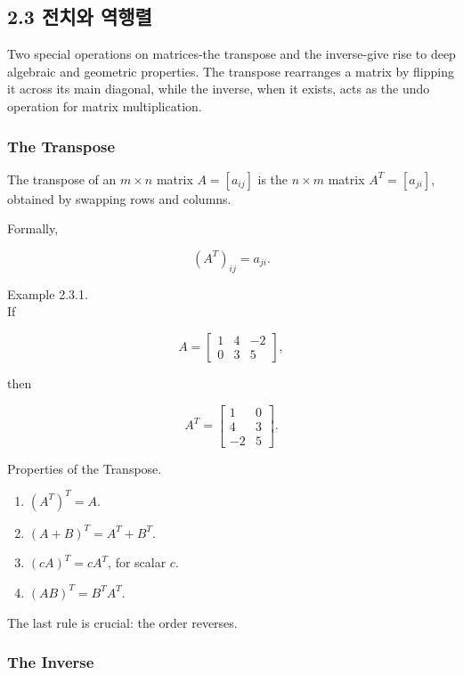 \documentclass[
  12pt,
  a4paper,
]{article}
\begin{document}
\subsection{2.3 전치와 역행렬}\label{23-transpose-and-inverse}

Two special operations on matrices-the transpose and the inverse-give
rise to deep algebraic and geometric properties. The transpose
rearranges a matrix by flipping it across its main diagonal, while the
inverse, when it exists, acts as the undo operation for matrix
multiplication.

\subsubsection{The Transpose}\label{the-transpose}

The transpose of an \(m \times n\) matrix \(A = [a_{ij}]\) is the
\(n \times m\) matrix \(A^T = [a_{ji}]\), obtained by swapping rows and
columns.

Formally,

\[(A^T)_{ij} = a_{ji}.\]

Example 2.3.1.\\
If

\[A = \begin{bmatrix}
1 & 4 & -2 \\
0 & 3 & 5
\end{bmatrix},\]

then

\[A^T = \begin{bmatrix}
1 & 0 \\
4 & 3 \\
-2 & 5
\end{bmatrix}.\]

Properties of the Transpose.

\begin{enumerate}
\def\labelenumi{\arabic{enumi}.}
\item
  \( (A^T)^T = A\).
\item
  \( (A+B)^T = A^T + B^T\).
\item
  \( (cA)^T = cA^T\), for scalar \(c\).
\item
  \( (AB)^T = B^T A^T\).
\end{enumerate}

The last rule is crucial: the order reverses.

\subsubsection{The Inverse}\label{the-inverse}
\end{document}
